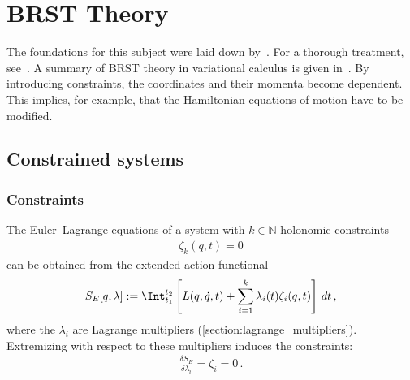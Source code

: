\chapter{BRST Theory}\label{chapter:constrained_dynamics}

    The foundations for this subject were laid down by~\cite{dirac_generalized_1950}. For a thorough treatment, see~\cite{henneaux_quantization_1992}. A summary of BRST theory in variational calculus is given in~\cite{stasheff_secret_1997}. By introducing constraints, the coordinates and their momenta become dependent. This implies, for example, that the Hamiltonian equations of motion have to be modified.

    \minitoc

\section{Constrained systems}\label{section:constrained_systems}
\subsection{Constraints}

    \begin{method}
        The Euler--Lagrange equations of a system with $k\in\mathbb{N}$ holonomic constraints
        \begin{gather}
            \zeta_k(q,t)=0
        \end{gather}
        can be obtained from the extended action functional
        \begin{gather}
            S_E[q,\lambda]:=\Int_{t_1}^{t_2}\left[L(q,\dot{q},t) + \sum_{i=1}^k\lambda_i(t)\zeta_i(q,t)\right]\,dt\,,
        \end{gather}
        where the $\lambda_i$ are Lagrange multipliers (\cref{section:lagrange_multipliers}). Extremizing with respect to these multipliers induces the constraints:
        \begin{gather}
            \frac{\delta S_E}{\delta\lambda_i}=\zeta_i=0\,.
        \end{gather}
    \end{method}

